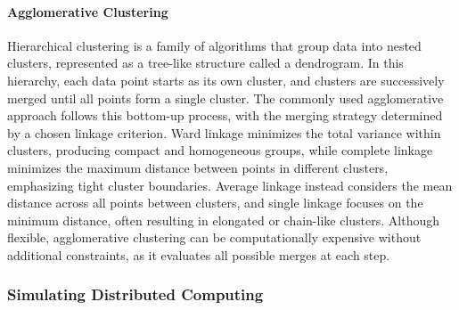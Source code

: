 \paragraph{Agglomerative Clustering}
\label{sec:background_ml_ac}

Hierarchical clustering is a family of algorithms that group data into nested clusters, represented as a tree-like structure called a dendrogram. In this hierarchy, each data point starts as its own cluster, and clusters are successively merged until all points form a single cluster. The commonly used agglomerative approach follows this bottom-up process, with the merging strategy determined by a chosen linkage criterion. Ward linkage minimizes the total variance within clusters, producing compact and homogeneous groups, while complete linkage minimizes the maximum distance between points in different clusters, emphasizing tight cluster boundaries. Average linkage instead considers the mean distance across all points between clusters, and single linkage focuses on the minimum distance, often resulting in elongated or chain-like clusters. Although flexible, agglomerative clustering can be computationally expensive without additional constraints, as it evaluates all possible merges at each step.

\subsubsection{Simulating Distributed Computing}
\label{sec:background_simulation}

